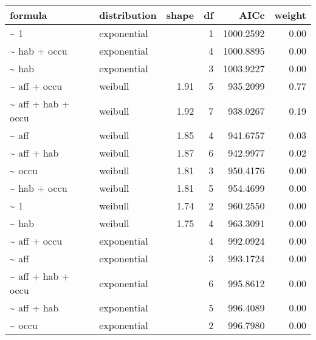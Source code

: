 \begin{table}[ht]
\centering
\begin{tabular}{llrrrr}
 formula & distribution & shape & df & AICc & weight \\ 
  \hline
\~{} 1 & exponential &  & 1 & 1000.2592 & 0.00 \\ 
  \~{} hab + occu & exponential &  & 4 & 1000.8895 & 0.00 \\ 
  \~{} hab & exponential &  & 3 & 1003.9227 & 0.00 \\ 
  \~{} aff + occu & weibull & 1.91 & 5 & 935.2099 & 0.77 \\ 
  \~{} aff + hab + occu & weibull & 1.92 & 7 & 938.0267 & 0.19 \\ 
  \~{} aff & weibull & 1.85 & 4 & 941.6757 & 0.03 \\ 
  \~{} aff + hab & weibull & 1.87 & 6 & 942.9977 & 0.02 \\ 
  \~{} occu & weibull & 1.81 & 3 & 950.4176 & 0.00 \\ 
  \~{} hab + occu & weibull & 1.81 & 5 & 954.4699 & 0.00 \\ 
  \~{} 1 & weibull & 1.74 & 2 & 960.2550 & 0.00 \\ 
  \~{} hab & weibull & 1.75 & 4 & 963.3091 & 0.00 \\ 
  \~{} aff + occu & exponential &  & 4 & 992.0924 & 0.00 \\ 
  \~{} aff & exponential &  & 3 & 993.1724 & 0.00 \\ 
  \~{} aff + hab + occu & exponential &  & 6 & 995.8612 & 0.00 \\ 
  \~{} aff + hab & exponential &  & 5 & 996.4089 & 0.00 \\ 
  \~{} occu & exponential &  & 2 & 996.7980 & 0.00 \\ 
  \end{tabular}
\label{tab:mod}
\end{table}

